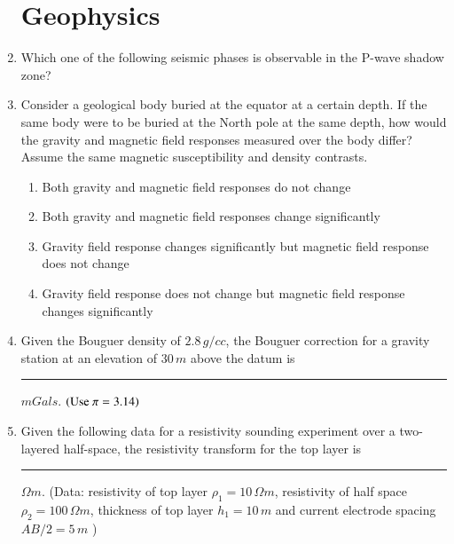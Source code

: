\documentclass[journal,12pt,onecolumn]{IEEEtran}
\theoremstyle{remark}
\begin{document}
\begin{enumerate}
    \section*{Geophysics  }
    
    \item Which one of the following seismic phases is observable in the P-wave shadow zone? \hfill{}
        \begin{enumerate} 
        \end{enumerate}
    
    \item Consider a geological body buried at the equator at a certain depth. If the same body were to be buried at the North pole at the same depth, how would the gravity and magnetic field responses measured over the body differ? Assume the same magnetic susceptibility and density contrasts.  \hfill{}
        \begin{enumerate} 
            \item Both gravity and magnetic field responses do not change
            \item Both gravity and magnetic field responses change significantly
            \item Gravity field response changes significantly but magnetic field response does not change
            \item Gravity field response does not change but magnetic field response changes significantly
        \end{enumerate}
    
    \item Given the Bouguer density of $2.8\,g/cc$, the Bouguer correction for a gravity station at an elevation of $30\,m$ above the datum is \rule{3cm}{0.15mm} $mGals$. $\left(\text{Use } \pi=3.14\right)$ \hfill{}
    
    \item Given the following data for a resistivity sounding experiment over a two-layered half-space, the resistivity transform for the top layer is \rule{3cm}{0.15mm} $\Omega m$. (Data: resistivity of top layer $\rho_1=10\,\Omega m$, resistivity of half space $\rho_2=100\,\Omega m$, thickness of top layer $h_1=10\,m$ and current electrode spacing $AB/2 = 5\,m$ ) \hfill{}
    

\end{enumerate}
\end{document}
